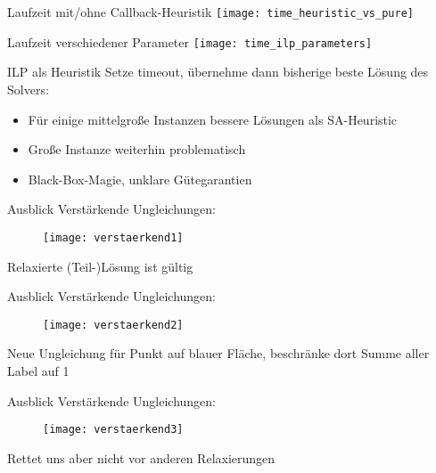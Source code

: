 \documentclass[ngerman,aspectratio=169,10pt]{beamer}
\begin{document}
\begin{frame}{Laufzeit mit/ohne Callback-Heuristik}
    \centering
    \texttt{[image: time\_heuristic\_vs\_pure]}
\end{frame}

\begin{frame}{Laufzeit verschiedener Parameter}
    \centering
    \texttt{[image: time\_ilp\_parameters]}
\end{frame}

\begin{frame}{ILP als Heuristik}
    Setze timeout, übernehme dann bisherige beste Lösung des Solvers:
    \begin{itemize}
        \item Für einige mittelgroße Instanzen bessere Lösungen als SA-Heuristic
        \item Große Instanze weiterhin problematisch
        \item Black-Box-Magie, unklare Gütegarantien
    \end{itemize}
\end{frame}

\begin{frame}{Ausblick}
    Verstärkende Ungleichungen:\\[10pt]
    \begin{figure}
        \texttt{[image: verstaerkend1]}
    \end{figure}
    Relaxierte (Teil-)Lösung ist gültig
\end{frame}

\begin{frame}{Ausblick}
    Verstärkende Ungleichungen:\\[10pt]
    \begin{figure}
        \texttt{[image: verstaerkend2]}
    \end{figure}
    Neue Ungleichung für Punkt auf blauer Fläche, beschränke dort Summe aller Label auf 1
\end{frame}

\begin{frame}{Ausblick}
    Verstärkende Ungleichungen:\\[10pt]
    \begin{figure}
        \texttt{[image: verstaerkend3]}
    \end{figure}
    Rettet uns aber nicht vor anderen Relaxierungen
\end{frame}
\end{document}
